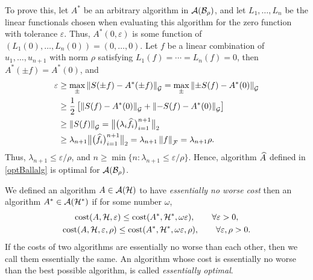 \documentclass[final]{elsarticle}
\theoremstyle{definition}
\theoremstyle{remark}
\begin{document}
To prove this, let $A^*$ be an arbitrary algorithm in $\ca(\cb_{\rho})$, and let $L_1, \ldots, L_n$ be the linear functionals chosen when evaluating this algorithm for the zero function with tolerance $\varepsilon$.  Thus, $A^*(0,\varepsilon)$ is some function of $(L_1(0) , \ldots, L_n(0)) = (0, \ldots, 0)$.  Let $f$ be a linear combination of $u_1, \ldots, u_{n+1}$ with norm $\rho$ satisfying  $L_1(f) = \cdots = L_n(f) = 0$, then $A^*(\pm f) = A^*(0)$, and
\begin{align*}
\varepsilon & \ge \max_{\pm} \norm[\cg]{S(\pm f) - A^*(\pm f)} =  \max_{\pm} \norm[\cg]{\pm S( f) - A^*(0)} \\
& \ge \frac 12 \left [ \norm[\cg]{S( f) - A^*(0)} + \norm[\cg]{- S( f) - A^*(0)}\right] \\
& \ge \norm[\cg]{S(f)} 
= \bignorm[2]{\big(\lambda_i\hf_i\big)_{i=1}^{n+1}} \\
& \ge \lambda_{n+1} \bignorm[2]{\big(\hf_i\big)_{i=1}^{n+1}} = \lambda_{n+1} \norm[\cf]{f} = \lambda_{n+1} \rho.
\end{align*}
Thus, $\lambda_{n+1} \le \varepsilon/\rho$, and $n \ge \min\{ n : \lambda_{n+1} \le \varepsilon/\rho \}$.  Hence, algorithm $\hA$ defined in \eqref{optBallalg} is optimal for $\ca(\cb_{\rho})$.

We defined an algorithm $A \in \ca(\ch)$ to have \emph{essentially no worse cost} then an algorithm $A^* \in \ca(\ch^*)$ if for some number $\omega$,
\begin{gather}
\cost(A,\ch,\varepsilon) \le \cost(A^*,\ch^*,\omega\varepsilon), \qquad \forall \varepsilon > 0, \\
\cost(A,\ch,\varepsilon,\rho) \le \cost(A^*,\ch^*,\omega\varepsilon,\rho), \qquad \forall \varepsilon,\rho > 0.
\end{gather}
If the costs of two algorithms are essentially no worse than each other, then we call them essentially the same.  An algorithm whose cost is essentially no worse than the best possible algorithm, is called \emph{essentially optimal}.
\end{document}
